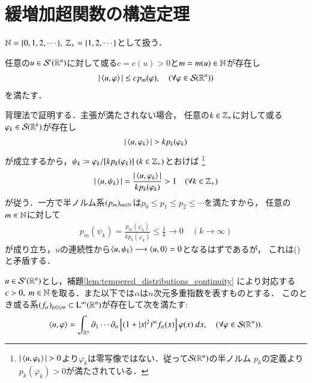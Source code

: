 \section{緩増加超関数の構造定理}
	$\mathbb{N} = \{0,1,2,\cdots\},\ \mathbb{Z}_+ = \{1,2,\cdots\}$として扱う．
	\begin{screen}
		\begin{lem}
			任意の$u \in \mathcal{S}'(\mathbb{R}^n)$に対して或る$c = c(u) > 0$と$m = m(u) \in \mathbb{N}$が存在し
			\begin{align}
				|\inprod<u,\varphi>| \leq c p_m(\varphi),
				\quad (\forall \varphi \in \rapid{\R^n})
			\end{align}
			を満たす．
			\label{lem:tempered_distributions_continuity}
		\end{lem}
	\end{screen}
	
	\begin{prf}
		背理法で証明する．主張が満たされない場合，
		任意の$k \in \mathbb{Z}_+$に対して或る$\varphi_k \in \mathcal{S}(\mathbb{R}^k)$が存在し
		\begin{align}
			|\inprod<u,\varphi_k>| > k p_k(\varphi_k)
		\end{align}
		が成立するから，$\psi_k \coloneqq \varphi_k / [k p_k(\varphi_k)]\ (k \in \mathbb{Z}_+)$とおけば
		\footnote{
			$|\inprod<u,\varphi_k>| > 0$より$\varphi_k$は零写像ではない．従って$\mathcal{S}(\mathbb{R}^n)$の半ノルム
			$p_k$の定義より$p_k(\varphi_k) > 0$が満たされている．
		}
		\begin{align}
			|\inprod<u,\psi_k>| = \frac{|\inprod<u,\varphi_k>|}{k p_k(\varphi_k)} > 1
			\quad (\forall k \in \Z_+)
			\label{eq:lem_tempered_distributions_continuity}
		\end{align}
		が従う．一方で半ノルム系$(p_m)_{m \in \mathbb{N}}$は$p_0 \leq p_1 \leq p_2 \leq \cdots$を満たすから，
		任意の$m \in \mathbb{N}$に対して
		\begin{align}
			p_m(\psi_k) = \frac{p_m(\varphi_k)}{k p_k(\varphi_k)} \leq \frac{1}{k}
			\longrightarrow 0 \quad (k \longrightarrow \infty)
		\end{align}
		が成り立ち，$u$の連続性から$\inprod<u,\psi_k> \longrightarrow \inprod<u,0> = 0$となるはずであるが，
		これは()と矛盾する．
		\QED
	\end{prf}
	
	\begin{screen}
		\begin{thm}[緩増加超関数の構造定理]
			$u \in \mathcal{S}'(\mathbb{R}^n)$とし，補題\ref{lem:tempered_distributions_continuity}
			により対応する$c > 0,\ m \in \mathbb{N}$を取る．また以下では$\alpha$は$n$次元多重指数を表すものとする．
			このとき或る系$(f_\alpha)_{|\alpha| \leq m} \subset \mathrm{L}^\infty(\mathbb{R}^n)$が存在して次を満たす:
			\begin{align}
				\inprod<u,\varphi> =
				\int_{\R^n} \partial_1 \cdots \partial_n \left[(1+|x|^2)^m f_\alpha(x)\right] \varphi(x)\ dx,
				\quad (\forall \varphi \in \rapid{\R^n}).
			\end{align}
			\label{thm:structure_theorem_of_tempered_distributions}
		\end{thm}
	\end{screen}
	
